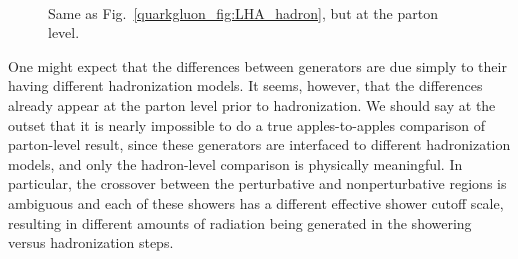 \documentclass[11pt]{cernrep}
\begin{document}
\begin{figure}
\centering
{}
$\qquad$

\caption{Same as Fig.~\ref{quarkgluon_fig:LHA_hadron}, but at the parton level.}
\label{quarkgluon_fig:LHA_parton}
\end{figure}

One might expect that the differences between generators are due
simply to their having different hadronization models.  It seems,
however, that the differences already appear at the parton level prior
to hadronization. We should say at the outset that it is nearly impossible to do a true apples-to-apples comparison of parton-level result, since these generators are interfaced to different hadronization models, and only the hadron-level comparison is physically meaningful.  In particular, the crossover between the perturbative and nonperturbative regions is ambiguous and each of these showers has a different effective shower cutoff scale, resulting in different amounts of radiation being generated in the showering versus hadronization steps.
\end{document}

